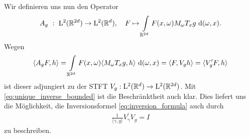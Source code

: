 Wir definieren uns nun den Operator
\begin{align*}
A_g \ : \ \mathrm{L}^2(\mathbb{R}^{2d}) \to \mathrm{L}^2(\mathbb{R}^d), \quad
F \mapsto  \int \limits_{\mathbb{R}^{2d}} F(x,\omega) M_\omega T_x g \text{ d} (\omega,x).
\end{align*}
Wegen 
\begin{align*}
\langle A_g F , h \rangle 
=
\int \limits_{\mathbb{R}^{2d}} F(x,\omega) \langle M_\omega T_x  g , h \rangle \text{ d} (\omega,x)
= 
\langle F , V_g h \rangle = 
\langle V_g^\prime F , h \rangle 
\end{align*}
ist dieser adjungiert zu der STFT $ V_g  :  \mathrm{L}^2(\mathbb{R}^d) \to \mathrm{L}^2(\mathbb{R}^{2d}) $.
Mit \eqref{eq:unique_inverse_bounded} ist die Beschränktheit auch klar.
Dies liefert uns die Möglichkeit, die Inversionsformel \eqref{eq:inversion_formula} auch durch
\begin{align}\label{eq:inversion_formula_operator}
\frac{1}{\langle \gamma,g \rangle } V^\prime_\gamma V_g = I
\end{align}
zu beschreiben.